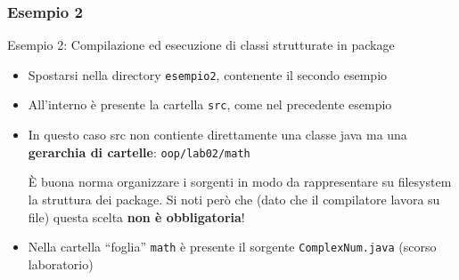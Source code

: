 \documentclass[presentation]{beamer}
\begin{document}

\subsubsection{Esempio 2}
\begin{frame}{Esempio 2: Compilazione ed esecuzione di classi strutturate in package}
	\begin{itemize}
		\item Spostarsi nella directory \texttt{esempio2}, contenente il secondo esempio
		\item All'interno è presente la cartella \texttt{src}, come nel precedente esempio 
		\item In questo caso src non contiente direttamente una classe java ma una \textbf{gerarchia di cartelle}: \texttt{oop/lab02/math}\\
		\begin{beamerboxesrounded}[shadow=true]{}
			È buona norma organizzare i sorgenti in modo da rappresentare su filesystem la struttura dei package. Si noti però che (dato che il compilatore lavora su \alert{file}) questa scelta \textbf{non è obbligatoria}!
		\end{beamerboxesrounded}
		\item Nella cartella ``foglia'' \texttt{math} è presente il sorgente \texttt{ComplexNum.java} (scorso laboratorio)
	\end{itemize}
\end{frame}
\end{document}
